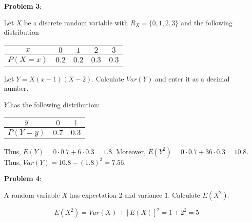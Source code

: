 \documentclass{article}
\begin{document}
\noindent\textbf{Problem 3}:

Let $X$ be a discrete random variable with $R_X=\{0,1,2,3\}$ and the following distribution

\begin{center}
    \begin{tabular}{|c|c|c|c|c|}
        \hline
        $x$&$0$&$1$&$2$&$3$\\
        \hline
        $P(X=x)$&$0.2$&$0.2$&$0.3$&$0.3$\\
        \hline
    \end{tabular}
\end{center}

Let $Y=X(x-1)(X-2)$. Calculate $Var(Y)$ and enter it as a decimal number.

{\color{blue}

$Y$ has the following distribution:

\begin{center}
    \begin{tabular}{|c|c|c|}
        \hline
        $y$&$0$&$1$\\
        \hline
        $P(Y=y)$&$0.7$&$0.3$\\
        \hline
    \end{tabular}
\end{center}

Thus, $E(Y)=0\cdot0.7+6\cdot0.3=1.8$. Moreover, $E(Y^2)=0\cdot0.7+36\cdot0.3=10.8$. Thus, $Var(Y)=10.8-(1.8)^2=7.56$.

}

\noindent\textbf{Problem 4}:

A random variable $X$ has expectation $2$ and variance $1$. Calculate $E(X^2)$.

{\color{blue}

\[E(X^2)=Var(X)+[E(X)]^2=1+2^2=5\]

}
\end{document}
